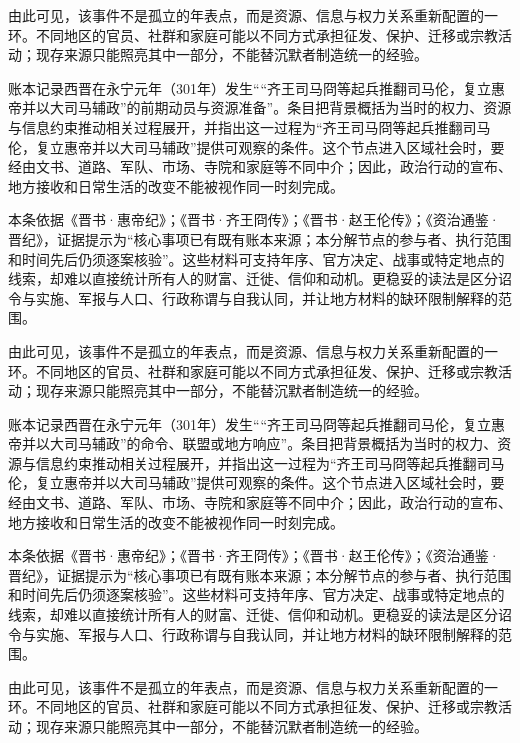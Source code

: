 由此可见，该事件不是孤立的年表点，而是资源、信息与权力关系重新配置的一环。不同地区的官员、社群和家庭可能以不同方式承担征发、保护、迁移或宗教活动；现存来源只能照亮其中一部分，不能替沉默者制造统一的经验。

账本记录西晋在永宁元年（301年）发生““齐王司马冏等起兵推翻司马伦，复立惠帝并以大司马辅政”的前期动员与资源准备”。条目把背景概括为当时的权力、资源与信息约束推动相关过程展开，并指出这一过程为“齐王司马冏等起兵推翻司马伦，复立惠帝并以大司马辅政”提供可观察的条件。这个节点进入区域社会时，要经由文书、道路、军队、市场、寺院和家庭等不同中介；因此，政治行动的宣布、地方接收和日常生活的改变不能被视作同一时刻完成。

本条依据《晋书·惠帝纪》；《晋书·齐王冏传》；《晋书·赵王伦传》；《资治通鉴·晋纪》，证据提示为“核心事项已有既有账本来源；本分解节点的参与者、执行范围和时间先后仍须逐案核验”。这些材料可支持年序、官方决定、战事或特定地点的线索，却难以直接统计所有人的财富、迁徙、信仰和动机。更稳妥的读法是区分诏令与实施、军报与人口、行政称谓与自我认同，并让地方材料的缺环限制解释的范围。

由此可见，该事件不是孤立的年表点，而是资源、信息与权力关系重新配置的一环。不同地区的官员、社群和家庭可能以不同方式承担征发、保护、迁移或宗教活动；现存来源只能照亮其中一部分，不能替沉默者制造统一的经验。

账本记录西晋在永宁元年（301年）发生““齐王司马冏等起兵推翻司马伦，复立惠帝并以大司马辅政”的命令、联盟或地方响应”。条目把背景概括为当时的权力、资源与信息约束推动相关过程展开，并指出这一过程为“齐王司马冏等起兵推翻司马伦，复立惠帝并以大司马辅政”提供可观察的条件。这个节点进入区域社会时，要经由文书、道路、军队、市场、寺院和家庭等不同中介；因此，政治行动的宣布、地方接收和日常生活的改变不能被视作同一时刻完成。

本条依据《晋书·惠帝纪》；《晋书·齐王冏传》；《晋书·赵王伦传》；《资治通鉴·晋纪》，证据提示为“核心事项已有既有账本来源；本分解节点的参与者、执行范围和时间先后仍须逐案核验”。这些材料可支持年序、官方决定、战事或特定地点的线索，却难以直接统计所有人的财富、迁徙、信仰和动机。更稳妥的读法是区分诏令与实施、军报与人口、行政称谓与自我认同，并让地方材料的缺环限制解释的范围。

由此可见，该事件不是孤立的年表点，而是资源、信息与权力关系重新配置的一环。不同地区的官员、社群和家庭可能以不同方式承担征发、保护、迁移或宗教活动；现存来源只能照亮其中一部分，不能替沉默者制造统一的经验。

